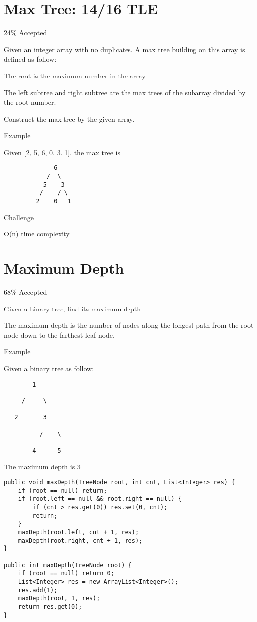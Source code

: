 \documentclass[12pt]{book}
\begin{document}
\chapter{Max Tree: 14/16 TLE}
\label{sec-35}

24\% Accepted

Given an integer array with no duplicates. A max tree building on this array is defined as follow:

The root is the maximum number in the array

The left subtree and right subtree are the max trees of the subarray divided by the root number.

Construct the max tree by the given array.

Example

Given [2, 5, 6, 0, 3, 1], the max tree is
\lstset{language=java,label= ,caption= ,numbers=none}
\begin{lstlisting}
              6
            /  \
           5    3
          /    / \
         2    0   1
\end{lstlisting}
Challenge

O(n) time complexity
\chapter{Maximum Depth}
\label{sec-36}

68\% Accepted

Given a binary tree, find its maximum depth.

The maximum depth is the number of nodes along the longest path from the root node down to the farthest leaf node.

Example

Given a binary tree as follow:
\lstset{language=java,label= ,caption= ,numbers=none}
\begin{lstlisting}
        1

     /     \ 

   2       3

          /    \

        4      5
\end{lstlisting}

The maximum depth is 3
\lstset{language=java,label= ,caption= ,numbers=none}
\begin{lstlisting}
public void maxDepth(TreeNode root, int cnt, List<Integer> res) {
    if (root == null) return;
    if (root.left == null && root.right == null) {
        if (cnt > res.get(0)) res.set(0, cnt);
        return;
    }
    maxDepth(root.left, cnt + 1, res);
    maxDepth(root.right, cnt + 1, res);
}
        
public int maxDepth(TreeNode root) {
    if (root == null) return 0;
    List<Integer> res = new ArrayList<Integer>();
    res.add(1);
    maxDepth(root, 1, res);
    return res.get(0);
}
\end{lstlisting}
\end{document}
